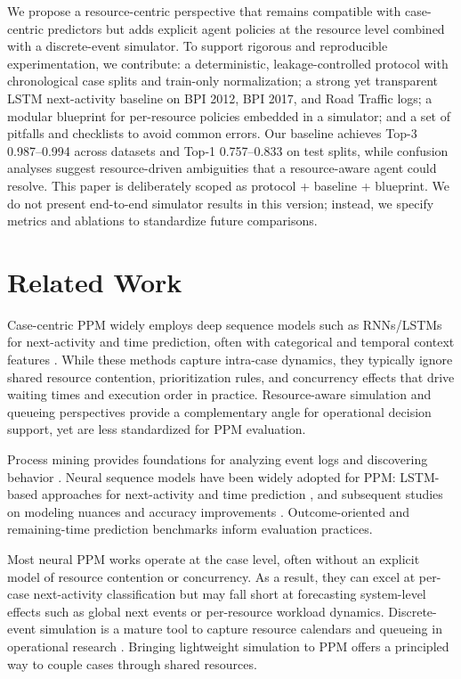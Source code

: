 \documentclass{article}
\theoremstyle{plain}
\theoremstyle{definition}
\theoremstyle{remark}
\begin{document}
	We propose a resource-centric perspective that remains compatible with case-centric predictors but adds explicit agent policies at the resource level combined with a discrete-event simulator. To support rigorous and reproducible experimentation, we contribute: a deterministic, leakage-controlled protocol with chronological case splits and train-only normalization; a strong yet transparent LSTM next-activity baseline on BPI 2012, BPI 2017, and Road Traffic logs; a modular blueprint for per-resource policies embedded in a simulator; and a set of pitfalls and checklists to avoid common errors. Our baseline achieves Top-3 0.987--0.994 across datasets and Top-1 0.757--0.833 on test splits, while confusion analyses suggest resource-driven ambiguities that a resource-aware agent could resolve. This paper is deliberately scoped as protocol + baseline + blueprint. We do not present end-to-end simulator results in this version; instead, we specify metrics and ablations to standardize future comparisons.
	
	\section{Related Work}
	\label{sec:related}
	Case-centric PPM widely employs deep sequence models such as RNNs/LSTMs for next-activity and time prediction, often with categorical and temporal context features \citep{goodfellow2016deep, hochreiter1997lstm}. While these methods capture intra-case dynamics, they typically ignore shared resource contention, prioritization rules, and concurrency effects that drive waiting times and execution order in practice. Resource-aware simulation and queueing perspectives provide a complementary angle for operational decision support, yet are less standardized for PPM evaluation. 
	
	Process mining provides foundations for analyzing event logs and discovering behavior \citep{vdaalst2016process}. Neural sequence models have been widely adopted for PPM: LSTM-based approaches for next-activity and time prediction \citep{tax2017predictive,evermann2017predicting}, and subsequent studies on modeling nuances and accuracy improvements \citep{camargo2020learning}. Outcome-oriented and remaining-time prediction benchmarks inform evaluation practices.
	
	Most neural PPM works operate at the case level, often without an explicit model of resource contention or concurrency. As a result, they can excel at per-case next-activity classification but may fall short at forecasting system-level effects such as global next events or per-resource workload dynamics. Discrete-event simulation is a mature tool to capture resource calendars and queueing in operational research \citep{law2014simulation}. Bringing lightweight simulation to PPM offers a principled way to couple cases through shared resources.
	
\end{document}
